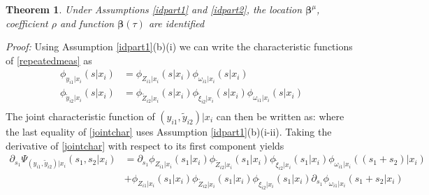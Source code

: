 \documentclass[11pt]{article}
\newtheorem{theorem}{Theorem}[section]
\begin{document}
\begin{theorem}
Under Assumptions \ref{idpart1} and \ref{idpart2}, the location $\boldsymbol{\beta}^{\mu}$, coefficient $\rho$ and function $\boldsymbol{\beta}(\tau)$ are identified
\end{theorem}
\textit{Proof:}
Using Assumption \ref{idpart1}(b)(i) we can write the characteristic functions of \eqref{repeatedmeas} as
\begin{equation} \label{repchar}
\begin{split}
\phi_{y_{i1}|x_{i}}(s|x_{i})&=\phi_{Z_{i1}|x_{i}}(s|x_{i})\phi_{\omega_{i1}|x_{i}}(s|x_{i})\\
\phi_{\tilde{y}_{i2}|x_{i}}(s|x_{i})&=\phi_{\tilde{Z}_{i2}|x_{i}}(s|x_{i})\phi_{\tilde{\xi}_{i2}|x_{i}}(s|x_{i})\phi_{\omega_{i1}|x_{i}}(s|x_{i})\\
\end{split}
\end{equation}
The joint characteristic function of $(y_{i1}, \tilde{y}_{i2})|x_{i}$ can then be written as:
where the last equality of \eqref{jointchar} uses Assumption \ref{idpart1}(b)(i-ii). Taking the derivative of \eqref{jointchar} with respect to its first component yields
\begin{equation*}
\begin{split}
\partial_{s_{1}}\Psi_{(y_{i1}, \tilde{y}_{i2})|x_{i}}(s_{1}, s_{2}|x_{i})&=\partial_{s_{1}}\phi_{Z_{i1}|x_{i}}(s_{1}|x_{i})\phi_{\tilde{Z}_{i2}|x_{i}}(s_{1}|x_{i})\phi_{\tilde{\xi}_{i2}|x_{i}}(s_{1}|x_{i})\phi_{\omega_{i1}|x_{i}}((s_{1}+s_{2})|x_{i})\\
&+\phi_{Z_{i1}|x_{i}}(s_{1}|x_{i})\phi_{\tilde{Z}_{i2}|x_{i}}(s_{1}|x_{i})\phi_{\tilde{\xi}_{i2}|x_{i}}(s_{1}|x_{i})\partial_{s_{1}}\phi_{\omega_{i1}|x_{i}}(s_{1}+s_{2}|x_{i})
\end{split}
\end{equation*}
\end{document}

